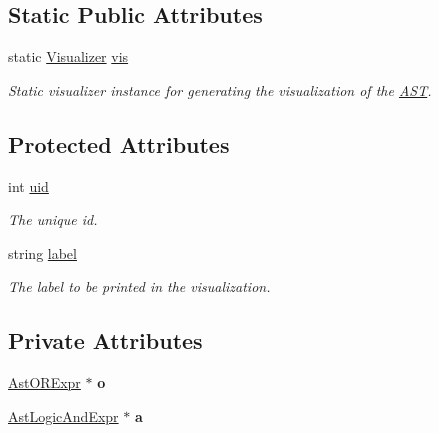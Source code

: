 \subsection*{Static Public Attributes}
\begin{DoxyCompactItemize}
\item 
\hypertarget{classAST_aca9e6637209b31e03a09c0d42f29bdfa}{static \hyperlink{classVisualizer}{Visualizer} \hyperlink{classAST_aca9e6637209b31e03a09c0d42f29bdfa}{vis}}\label{classAST_aca9e6637209b31e03a09c0d42f29bdfa}

\begin{DoxyCompactList}\small\item\em Static visualizer instance for generating the visualization of the \hyperlink{classAST}{A\-S\-T}. \end{DoxyCompactList}\end{DoxyCompactItemize}
\subsection*{Protected Attributes}
\begin{DoxyCompactItemize}
\item 
\hypertarget{classAST_a847b778f1c3dd5a19de32de432ee6e15}{int \hyperlink{classAST_a847b778f1c3dd5a19de32de432ee6e15}{uid}}\label{classAST_a847b778f1c3dd5a19de32de432ee6e15}

\begin{DoxyCompactList}\small\item\em The unique id. \end{DoxyCompactList}\item 
\hypertarget{classAST_ab2e239ccc0688d2341724432ff5a1a31}{string \hyperlink{classAST_ab2e239ccc0688d2341724432ff5a1a31}{label}}\label{classAST_ab2e239ccc0688d2341724432ff5a1a31}

\begin{DoxyCompactList}\small\item\em The label to be printed in the visualization. \end{DoxyCompactList}\end{DoxyCompactItemize}
\subsection*{Private Attributes}
\begin{DoxyCompactItemize}
\item 
\hypertarget{classAstLogicAndExpr_a1133c2d85c0c471648c56ee9aae03aa6}{\hyperlink{classAstORExpr}{Ast\-O\-R\-Expr} $\ast$ {\bfseries o}}\label{classAstLogicAndExpr_a1133c2d85c0c471648c56ee9aae03aa6}

\item 
\hypertarget{classAstLogicAndExpr_af596fe2e0d1cfbd6cdd8d95f5e89f44a}{\hyperlink{classAstLogicAndExpr}{Ast\-Logic\-And\-Expr} $\ast$ {\bfseries a}}\label{classAstLogicAndExpr_af596fe2e0d1cfbd6cdd8d95f5e89f44a}

\end{DoxyCompactItemize}


